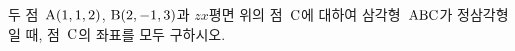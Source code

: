두 점~$\mathrm{A}(1{,}\mkern3mu\mathopen{}1{,}\mkern3mu\mathopen{}2)$, $\mathrm{B}(2{,}\mkern3mu\mathopen{}-1{,}\mkern3mu\mathopen{}3)$과 $zx$평면 위의 점~$\mathrm{C}$에 대하여 삼각형~$\mathrm{ABC}$가 정삼각형일 때, 점~$\mathrm{C}$의 좌표를 모두 구하시오.
